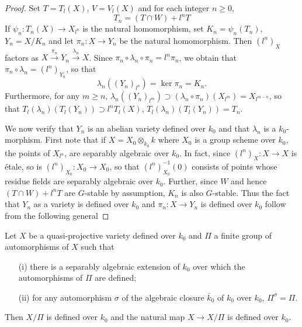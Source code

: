\begin{proof}
Set $T = T_l (X)$, $V = V_l(X)$ and for each integer $n \geqslant 0$,
$$
T_n = (T \cap W) + l^n T
$$
If $\psi_n: T_n (X) \to X_{l^n}$ is the natural homomorphism, set $K_n = \psi_n(T_n)$, $Y_n = X/K_n$ and let $\pi_n : X \to Y_n$ be the natural homomorphism. Then  $(l^n)_X$ factors as $X \xrightarrow{\pi_n} Y_n \xrightarrow{\lambda_n} X$. Since $\pi_n \circ \lambda_n \circ \pi_n = l^n \pi_n$, we obtain that $\pi_n \circ \lambda_n =(l^n)_{Y_n}$, so that
$$
\lambda_n ((Y_n)_{l^n}) = \ker \pi_n = K_n.
$$
Furthermore, for any $m \geqslant n$, $\lambda_n ((Y_n)_{l^m}) \supset (\lambda_n \circ \pi_n) (X_{l^m}) = X_{l^{m-n}}$, so that $T_l(\lambda_n) (T_l (Y_n)) \supset l^n T_l(X)$, $T_l (\lambda_n) (T_l (Y_n)) = T_n$.

We now verify that $Y_n$ is an abelian variety defined over $k_0$ and that $\lambda_n$ is a $k_0$-morphism. First note that if $X = X_0 \otimes_{k_0} k$ where $X_0$ is a group scheme over $k_0$, the points of $X_{l^n}$, are separably algebraic over $k_0$. In fact, since $(l^n)_X: X \to X$ is \'etale, so is $(l^n)_{X_0}: X_0 \to X_0$, so that $(l^n)^{-1}_{X_0} (0)$ consists of points whose residue fields are separably algebraic over $k_0$. Further, since $W$ and hence $(T \cap W) + l^n T $ are $G$-stable by assumption, $K_n$ is also $G$-stable. Thus the fact that $Y_n$ as a variety is defined over $k_0$ and $\pi_n : X \to Y_n$ is defined over $k_0$ follow from the following general
\end{proof}


\begin{lem}\label{apen1-lem2}
Let $X$ be a quasi-projective variety defined over $k_0$ and $\Pi$ a finite group of automorphisms of $X$ such that 
\begin{itemize}
\item[\rm (i)] there is a separably algebraic extension of $k_0$ over which the automorphisms of $\Pi$ are defined;

\item[\rm (ii)] for any automorphism $\sigma$ of the algebraic closure $\bar{k}_0$ of $k_0$ over $k_0$, $\Pi^\sigma = \Pi$.
\end{itemize}

Then $X/\Pi$ is defined over $k_0$ and the natural map $X \to X / \Pi$ is defined over $k_0$.
\end{lem}

